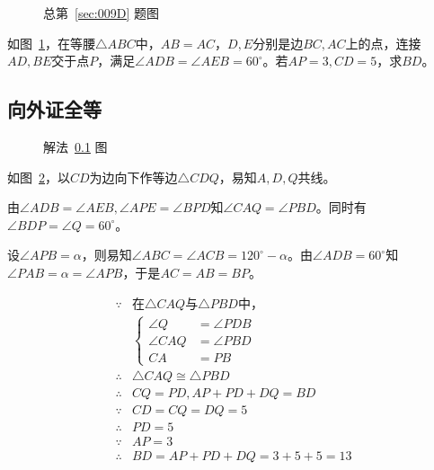 

\begin{figure}[htbp]
  \centering
  \caption{总第~\ref{sec:009D} 题图} \label{fig:009D}
\end{figure}

如图~\ref{fig:009D}，在等腰$\triangle ABC$中，$AB = AC$，$D, E$分别是边$BC, AC$上的点，连接$AD, BE$交于点$P$，满足$\angle ADB = \angle AEB = 60^\circ$。若$AP = 3, CD = 5$，求$BD$。


\subsection{向外证全等} \label{subsec:009D-oeq}

\begin{figure}[htbp]
  \centering
  \caption{解法~\ref{subsec:009D-oeq} 图} \label{fig:009D-oeq}
\end{figure}

如图~\ref{fig:009D-oeq}，以$CD$为边向下作等边$\triangle CDQ$，易知$A, D, Q$共线。

由$\angle ADB = \angle AEB, \angle APE = \angle BPD$知$\angle CAQ = \angle PBD$。同时有$\angle BDP = \angle Q = 60^\circ$。

设$\angle APB = \alpha$，则易知$\angle ABC = \angle ACB = 120^\circ - \alpha$。由$\angle ADB = 60^\circ$知$\angle PAB = \alpha = \angle APB$，于是$AC = AB = BP$。

\begin{align*}
  \because  {}& \text{在$\triangle CAQ$与$\triangle PBD$中，} \\
  & \left\{ \begin{aligned}
    \angle Q &= \angle PDB \\
    \angle CAQ &= \angle PBD \\
    CA &= PB
  \end{aligned} \right. \\
  \therefore{}& \triangle CAQ \cong \triangle PBD \\
  \therefore{}& CQ = PD, AP + PD + DQ = BD \\
  \because  {}& CD = CQ = DQ = 5 \\
  \therefore{}& PD = 5 \\
  \because  {}& AP = 3 \\
  \therefore{}& BD = AP + PD + DQ = 3 + 5 + 5 = 13
\end{align*}

